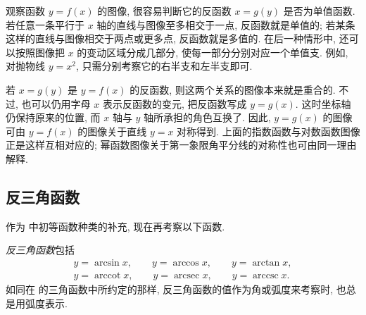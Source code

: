 \begin{figure}
\end{figure}
观察函数 $y=f(x)$ 的图像, 很容易判断它的反函数 $x=g(y)$ 是否为单值函数.
若任意一条平行于 $x$ 轴的直线与图像至多相交于一点, 反函数就是单值的;
若某条这样的直线与图像相交于两点或更多点, 反函数就是多值的.
在后一种情形中, 还可以按照图像把 $x$ 的变动区域分成几部分,
使每一部分分别对应一个单值支. 例如, 对抛物线 $y=x^2$,
只需分别考察它的右半支和左半支即可.

若 $x=g(y)$ 是 $y=f(x)$ 的反函数, 则这两个关系的图像本来就是重合的.
不过, 也可以仍用字母 $x$ 表示反函数的变元, 把反函数写成 $y=g(x)$.
这时坐标轴仍保持原来的位置, 而 $x$ 轴与 $y$ 轴所承担的角色互换了.
因此, $y=g(x)$ 的图像可由 $y=f(x)$ 的图像关于直线 $y=x$ 对称得到.
上面的指数函数与对数函数图像正是这样互相对应的;
幂函数图像关于第一象限角平分线的对称性也可由同一理由解释.

\subsection{反三角函数}\label{subsec:50}
作为  中初等函数种类的补充, 现在再考察以下函数.

\myrefparagraph{7\textdegree}\label{par:inverse_trigonometric_functions}
\emph{反三角函数}包括
\begin{gather*}
y=\arcsin x,\qquad y=\arccos x,\qquad y=\arctan x,\\
y=\operatorname{arccot}x,\qquad y=\operatorname{arcsec}x,\qquad y=\operatorname{arccsc}x.
\end{gather*}
如同在  的三角函数中所约定的那样,
反三角函数的值作为角或弧度来考察时, 也总是用弧度表示.


